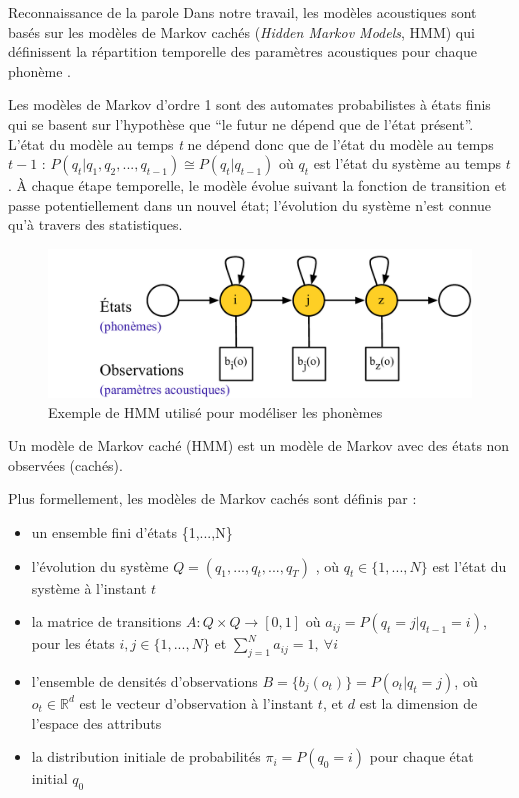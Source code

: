\documentclass{style/these}
\let\oldcite=\cite
\renewcommand{\cite}[1]{{\fontfamily{qcs}\selectfont{\color{darkerblue}[\oldcite{#1}]}}}
\begin{document}
\begin{part}{Reconnaissance de la parole}
Dans notre travail, les modèles acoustiques sont basés sur les modèles de Markov cachés (\textit{Hidden Markov Models}, \acrshort{HMM})  qui définissent la répartition temporelle des paramètres acoustiques pour chaque phonème \cite{Rabiner:1989, Picone:1990}. 

Les modèles de Markov d'ordre 1 sont des automates probabilistes à états finis qui se basent sur l'hypothèse que ``le futur ne dépend que de l'état présent''. 
L'état du modèle au temps \textit{t} ne dépend donc que de l'état du modèle au temps ${t-1}$ : $P(q_{t}|q_1,q_2, ...,q_{t-1}) \cong P(q_{t}|q_{t-1})$ où $q_{t}$ est l'état du système au temps $t$. 
À chaque étape temporelle, le modèle évolue suivant la fonction de transition et passe potentiellement dans un nouvel état; l'évolution du système n'est connue qu'à travers des statistiques.

\begin{figure}[h!]
\centering
\includegraphics[scale=0.5]{images/pictures/HMM.pdf}
\caption{Exemple de HMM utilisé pour modéliser les phonèmes}
\label{Fig:HMM2}
\end{figure}

Un modèle de Markov caché (\acrshort{HMM}) est un modèle de Markov avec des états non observées (cachés).

Plus formellement, les modèles de Markov cachés sont définis par : 
\begin{itemize}
\item un ensemble fini d'états \{1,...,N\}
\item l'évolution du système $Q=(q_1, ..., q_t, ..., q_T)$ , où $q_t \in \{1,...,N\}$ est l'état du système à l'instant $t$ 
\item la matrice de transitions $A:Q \times Q \rightarrow[0,1]$ où $a_{ij} = P(q_{t} = j | q_{t-1} = i)$, pour les états $i,j \in \{1, ..., N\}$ et $\sum\limits_{j=1}^{N} a_{ij} = 1,\ \forall i$
\item l'ensemble de densités d'observations $B=\{b_j(o_t)\} = P(o_t|q_t=j)$, où $o_t \in \mathbb{R}^{d}$ est le vecteur d'observation à l'instant $t$, et $d$ est la dimension de l'espace des attributs
\item la distribution initiale de probabilités $\pi_{i} = P(q_0=i)$ pour chaque état initial $q_0$
\end{itemize}


\end{part}
\end{document}
